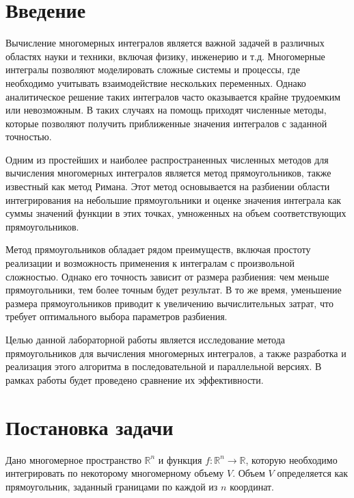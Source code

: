 \documentclass[12pt]{article}
\begin{document}
\newpage

\section*{Введение}
    Вычисление многомерных интегралов является важной задачей в различных областях науки и техники, включая физику, инженерию и т.д. Многомерные интегралы позволяют моделировать сложные системы и процессы, где необходимо учитывать взаимодействие нескольких переменных. Однако аналитическое решение таких интегралов часто оказывается крайне трудоемким или невозможным. В таких случаях на помощь приходят численные методы, которые позволяют получить приближенные значения интегралов с заданной точностью.
	
\vspace{1 cm}

    Одним из простейших и наиболее распространенных численных методов для вычисления многомерных интегралов является метод прямоугольников, также известный как метод Римана. Этот метод основывается на разбиении области интегрирования на небольшие прямоугольники и оценке значения интеграла как суммы значений функции в этих точках, умноженных на объем соответствующих прямоугольников.

\vspace{1 cm}

    Метод прямоугольников обладает рядом преимуществ, включая простоту реализации и возможность применения к интегралам с произвольной сложностью. Однако его точность зависит от размера разбиения: чем меньше прямоугольники, тем более точным будет результат. В то же время, уменьшение размера прямоугольников приводит к увеличению вычислительных затрат, что требует оптимального выбора параметров разбиения.

\vspace{1 cm}
    Целью данной лабораторной работы является исследование метода прямоугольников для вычисления многомерных интегралов, а также разработка и реализация этого алгоритма в последовательной и параллельной версиях. В рамках работы будет проведено сравнение их эффективности.

\newpage

\section{Постановка задачи}
Дано многомерное пространство $\mathbb{R}^n$ и функция $f: \mathbb{R}^n \to \mathbb{R}$, которую необходимо интегрировать по некоторому многомерному объему $V$. Объем $V$ определяется как прямоугольник, заданный границами по каждой из $n$ координат.
\end{document}
